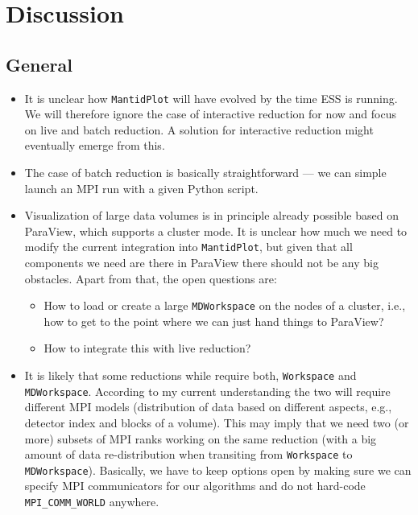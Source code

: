 \documentclass[a4paper,english,numbers=noenddot,bibliography=totoc,chapterprefix=on,DIV=12]{scrartcl}
\begin{document}
\section{Discussion}

\subsection{General}

\begin{itemize}
  \item It is unclear how \texttt{MantidPlot} will have evolved by the time ESS is running.
    We will therefore ignore the case of interactive reduction for now and focus on live and batch reduction.
    A solution for interactive reduction might eventually emerge from this.
  \item The case of batch reduction is basically straightforward --- we can simple launch an MPI run with a given Python script.
  \item Visualization of large data volumes is in principle already possible based on ParaView, which supports a cluster mode.
    It is unclear how much we need to modify the current integration into \texttt{MantidPlot}, but given that all components we need are there in ParaView there should not be any big obstacles.
    Apart from that, the open questions are:
    \begin{itemize}
      \item How to load or create a large \texttt{MDWorkspace} on the nodes of a cluster, i.e., how to get to the point where we can just hand things to ParaView?
      \item How to integrate this with live reduction?
    \end{itemize}
  \item It is likely that some reductions while require both, \texttt{Workspace} and \texttt{MDWorkspace}.
    According to my current understanding the two will require different MPI models (distribution of data based on different aspects, e.g., detector index and blocks of a volume).
    This may imply that we need two (or more) subsets of MPI ranks working on the same reduction (with a big amount of data re-distribution when transiting from \texttt{Workspace} to \texttt{MDWorkspace}).
    Basically, we have to keep options open by making sure we can specify MPI communicators for our algorithms and do not hard-code \texttt{MPI\_COMM\_WORLD} anywhere.
\end{itemize}
\end{document}
